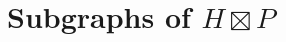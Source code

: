 \documentclass{patmorin}
\renewcommand{\le}{\leqslant}
\renewcommand{\leq}{\leqslant}
\DeclareMathOperator{\bw}{bw}
\begin{document}


\section{\boldmath Subgraphs of \texorpdfstring{$H\boxtimes P$}{H boxtimes P}}
\label{htimesp_section}

\end{document}
